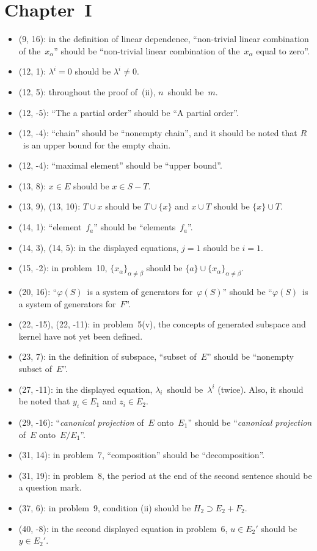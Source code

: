 \documentclass[letterpaper,12pt]{article}
\newcommand{\union}{\cup}
\begin{document}
\section*{Chapter~I}
\begin{itemize}
\item (9, 16): in the definition of linear dependence, ``non-trivial linear combination of the~\(x_{\alpha}\)'' should be ``non-trivial linear combination of the~\(x_{\alpha}\) equal to zero''.
\item (12, 1): \(\lambda^i=0\) should be \(\lambda^i\ne 0\).
\item (12, 5): throughout the proof of~(ii), \(n\)~should be~\(m\).
\item (12, -5): ``The a partial order'' should be ``A partial order''.
\item (12, -4): ``chain'' should be ``nonempty chain'', and it should be noted that \(R\)~is an upper bound for the empty chain.
\item (12, -4): ``maximal element'' should be ``upper bound''.
\item (13, 8): \(x\in E\) should be \(x\in S-T\).
\item (13, 9), (13, 10): \(T\union x\) should be \(T\union\{x\}\) and \(x\union T\) should be \(\{x\}\union T\).
\item (14, 1): ``element~\(f_a\)'' should be ``elements~\(f_a\)''.
\item (14, 3), (14, 5): in the displayed equations, \(j=1\) should be \(i=1\).
\item (15, -2): in problem~10, \(\{x_{\alpha}\}_{\alpha\ne\beta}\) should be \(\{a\}\union\{x_{\alpha}\}_{\alpha\ne\beta}\).
\item (20, 16): ``\(\varphi(S)\)~is a system of generators for~\(\varphi(S)\)'' should be ``\(\varphi(S)\)~is a system of generators for~\(F\)''.
\item (22, -15), (22, -11): in problem~5(v), the concepts of generated subspace and kernel have not yet been defined.
\item (23, 7): in the definition of subspace, ``subset of~\(E\)'' should be ``nonempty subset of~\(E\)''.
\item (27, -11): in the displayed equation, \(\lambda_i\)~should be~\(\lambda^i\) (twice). Also, it should be noted that \(y_i\in E_1\) and \(z_i\in E_2\).
\item (29, -16): ``\emph{canonical projection} of~\(E\) onto~\(E_1\)'' should be ``\emph{canonical projection} of~\(E\) onto~\(E/E_1\)''.
\item (31, 14): in problem~7, ``composition'' should be ``decomposition''.
\item (31, 19): in problem~8, the period at the end of the second sentence should be a question mark.
\item (37, 6): in problem~9, condition (ii) should be \(H_2\supset E_2+F_2\).
\item (40, -8): in the second displayed equation in problem~6, \(u\in E_2'\) should be \(y\in E_2'\).
\end{itemize}
\end{document}
